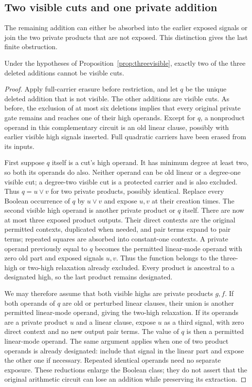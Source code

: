 \subsection{Two visible cuts and one private addition}
The remaining addition can either be absorbed into the earlier exposed signals or join the two private products that are not exposed. This distinction gives the last finite obstruction.

\begin{proposition}\label{prop:twovisiblefour}
Under the hypotheses of Proposition~\ref{prop:threevisible}, exactly two of the three deleted additions cannot be visible cuts.
\end{proposition}
\begin{proof}
Apply full-carrier erasure before restriction, and let $q$ be the unique deleted addition that is not visible. The other additions are visible cuts. As before, the exclusion of at most six deletions implies that every original private gate remains and reaches one of their high operands. Except for $q$, a nonproduct operand in this complementary circuit is an old linear clause, possibly with earlier visible high signals inserted. Full quadratic carriers have been erased from its inputs.

First suppose $q$ itself is a cut's high operand. It has minimum degree at least two, so both its operands do also. Neither operand can be old linear or a degree-one visible cut; a degree-two visible cut is a protected carrier and is also excluded. Thus $q=u\vee v$ for two private products, possibly identical. Replace every Boolean occurrence of $q$ by $u\vee v$ and expose $u,v$ at their creation times. The second visible high operand is another private product or $q$ itself. There are now at most three exposed product outputs. Their direct contexts are the original permitted contexts, duplicated when needed, and pair terms expand to pair terms; repeated squares are absorbed into constant-one contexts. A private operand previously equal to $q$ becomes the permitted linear-mode operand with zero old part and exposed signals $u,v$. Thus the function belongs to the three-high or two-high relaxation already excluded. Every product is ancestral to a designated high, so the last product remains designated.

We may therefore assume that both visible highs are private products $g,f$. If both operands of $q$ are old or perturbed linear clauses, their union is another permitted linear-mode operand, giving the two-high relaxation. If its operands are a private product $u$ and a linear clause, expose $u$ as a third signal, with zero direct context and no new output pair terms. The value of $q$ is then a permitted linear-mode operand. The same argument applies when one of two product operands is already designated: include that signal in the linear part and expose the other one if necessary. Repeated identical operands need no separate exposure. These reductions enlarge the Boolean class; they do not assert that the original arithmetic circuit can lose an addition while preserving its extraction.


\end{proof}
